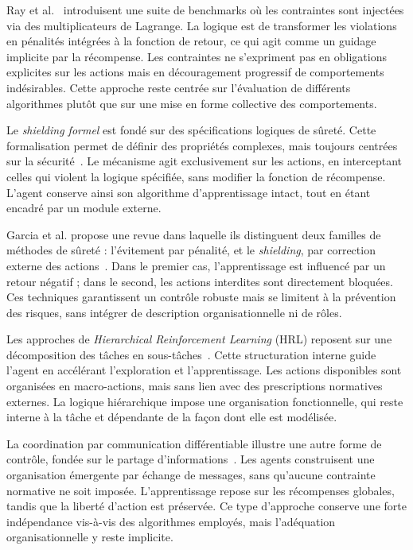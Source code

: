 \documentclass[francais,ROIA,Unicode,manuscript]{cedram}
\begin{document}
Ray et al.~\cite{ray2019benchmarking} introduisent une suite de benchmarks où les contraintes sont injectées via des multiplicateurs de Lagrange. La logique est de transformer les violations en pénalités intégrées à la fonction de retour, ce qui agit comme un guidage implicite par la récompense. Les contraintes ne s’expriment pas en obligations explicites sur les actions mais en découragement progressif de comportements indésirables. Cette approche reste centrée sur l’évaluation de différents algorithmes plutôt que sur une mise en forme collective des comportements.

Le \emph{shielding formel} est fondé sur des spécifications logiques de sûreté. Cette formalisation permet de définir des propriétés complexes, mais toujours centrées sur la sécurité~\cite{alshiekh2018safe}. Le mécanisme agit exclusivement sur les actions, en interceptant celles qui violent la logique spécifiée, sans modifier la fonction de récompense. L’agent conserve ainsi son algorithme d’apprentissage intact, tout en étant encadré par un module externe.

Garcia et al. propose une revue dans laquelle ils distinguent deux familles de méthodes de sûreté : l’évitement par pénalité, et le \emph{shielding}, par correction externe des actions~\cite{garcia2015comprehensive}. Dans le premier cas, l’apprentissage est influencé par un retour négatif ; dans le second, les actions interdites sont directement bloquées. Ces techniques garantissent un contrôle robuste mais se limitent à la prévention des risques, sans intégrer de description organisationnelle ni de rôles.

Les approches de \emph{Hierarchical Reinforcement Learning} (HRL) reposent sur une décomposition des tâches en sous-tâches~\cite{ghavamzadeh2006hrl}. Cette structuration interne guide l’agent en accélérant l’exploration et l’apprentissage. Les actions disponibles sont organisées en macro-actions, mais sans lien avec des prescriptions normatives externes. La logique hiérarchique impose une organisation fonctionnelle, qui reste interne à la tâche et dépendante de la façon dont elle est modélisée.

La coordination par communication différentiable illustre une autre forme de contrôle, fondée sur le partage d’informations~\cite{foerster2018communication}. Les agents construisent une organisation émergente par échange de messages, sans qu’aucune contrainte normative ne soit imposée. L’apprentissage repose sur les récompenses globales, tandis que la liberté d’action est préservée. Ce type d’approche conserve une forte indépendance vis-à-vis des algorithmes employés, mais l’adéquation organisationnelle y reste implicite.
\end{document}
